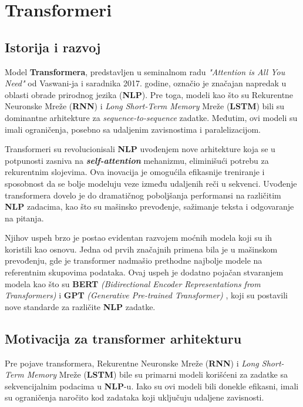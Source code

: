 \documentclass[12pt]{article}
\begin{document}
   \newpage
   \section{Transformeri}
   \subsection{Istorija i razvoj}
   Model \textbf{Transformera}, predstavljen u seminalnom radu \textit{"Attention is All You Need"} \cite{attentionneed} od Vaswani-ja i saradnika 2017. godine, 
   označio je značajan napredak u oblasti obrade prirodnog jezika (\textbf{NLP}). 
   Pre toga, modeli kao što su Rekurentne Neuronske Mreže (\textbf{RNN}) \cite{rnn} i 
   \textit{Long Short-Term Memory} Mreže (\textbf{LSTM}) \cite{lstm} bili su dominantne arhitekture za 
   \textit{sequence-to-sequence} zadatke. Međutim, ovi modeli su imali ograničenja, 
   posebno sa udaljenim zavisnostima i paralelizacijom.

   Transformeri su revolucionisali \textbf{NLP} uvođenjem nove arhitekture koja se u potpunosti zasniva na 
   \textbf{\textit{self-attention}} mehanizmu, eliminišući potrebu za rekurentnim slojevima. 
   Ova inovacija je omogućila efikasnije treniranje i sposobnost da se bolje modeluju veze između 
   udaljenih reči u sekvenci. Uvođenje transformera dovelo je do dramatičnog poboljšanja performansi 
   na različitim \textbf{NLP} zadacima, kao što su mašinsko prevođenje, sažimanje teksta i odgovaranje na pitanja.

   Njihov uspeh brzo je postao evidentan razvojem moćnih modela koji su ih koristili kao osnovu. 
   Jedna od prvih značajnih primena bila je u mašinskom prevođenju, gde je transformer 
   nadmašio prethodne najbolje modele na referentnim skupovima podataka. 
   Ovaj uspeh je dodatno pojačan stvaranjem modela kao što su \textbf{BERT} 
   \textit{(Bidirectional Encoder Representations from Transformers)} \cite{bert} i \textbf{GPT} 
   \textit{(Generative Pre-trained Transformer)} \cite{gpt2}, koji su postavili nove standarde za 
   različite \textbf{NLP} zadatke.

   \subsection{Motivacija za transformer arhitekturu}

   Pre pojave transformera, Rekurentne Neuronske Mreže (\textbf{RNN}) i 
   \textit{Long Short-Term Memory} Mreže (\textbf{LSTM}) bile su primarni 
   modeli korišćeni za zadatke sa sekvencijalnim podacima u \textbf{NLP}-u. 
   Iako su ovi modeli bili donekle efikasni, imali su ograničenja naročito kod zadataka koji uključuju udaljene zavisnosti.
\end{document}
